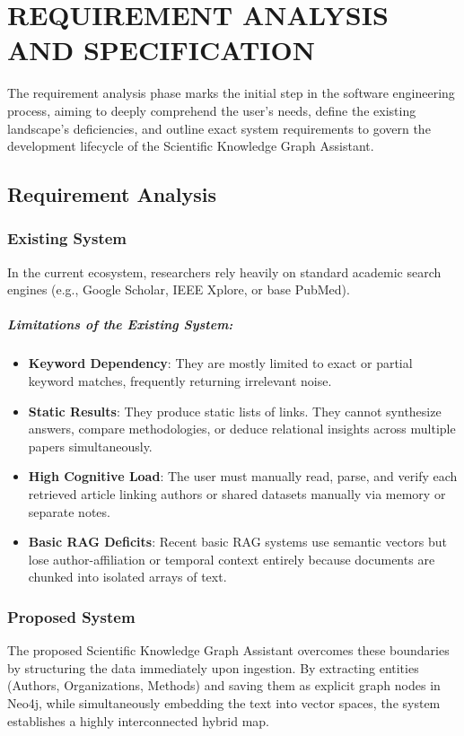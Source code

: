 \documentclass[12pt,a4paper]{report}
\begin{document}
\chapter{REQUIREMENT ANALYSIS AND SPECIFICATION}
\noindent{\rule{\textwidth}{1.5pt}}

The requirement analysis phase marks the initial step in the software engineering process, aiming to deeply comprehend the user's needs, define the existing landscape's deficiencies, and outline exact system requirements to govern the development lifecycle of the Scientific Knowledge Graph Assistant.

\section{Requirement Analysis}

\subsection{Existing System}
In the current ecosystem, researchers rely heavily on standard academic search engines (e.g., Google Scholar, IEEE Xplore, or base PubMed). 
\paragraph{Limitations of the Existing System:}
\begin{itemize}
    \item \textbf{Keyword Dependency}: They are mostly limited to exact or partial keyword matches, frequently returning irrelevant noise.
    \item \textbf{Static Results}: They produce static lists of links. They cannot synthesize answers, compare methodologies, or deduce relational insights across multiple papers simultaneously.
    \item \textbf{High Cognitive Load}: The user must manually read, parse, and verify each retrieved article linking authors or shared datasets manually via memory or separate notes.
    \item \textbf{Basic RAG Deficits}: Recent basic RAG systems use semantic vectors but lose author-affiliation or temporal context entirely because documents are chunked into isolated arrays of text.
\end{itemize}

\subsection{Proposed System}
The proposed Scientific Knowledge Graph Assistant overcomes these boundaries by structuring the data immediately upon ingestion. By extracting entities (Authors, Organizations, Methods) and saving them as explicit graph nodes in Neo4j, while simultaneously embedding the text into vector spaces, the system establishes a highly interconnected hybrid map. 
\end{document}
